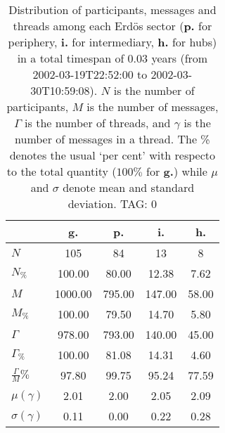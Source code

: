 \begin{table}[h!]
\begin{center}
\begin{tabular}{| l | c | c | c | c |}\hline
 & g. & p. & i. & h. \\\hline
$N$ & 105  & 84  & 13  & 8 \\\hline
$N_{\%}$ & 100.00  & 80.00  & 12.38  & 7.62 \\\hline
$M$ & 1000.00  & 795.00  & 147.00  & 58.00 \\\hline
$M_{\%}$ & 100.00  & 79.50  & 14.70  & 5.80 \\\hline
$\Gamma$ & 978.00  & 793.00  & 140.00  & 45.00 \\\hline
$\Gamma_{\%}$ & 100.00  & 81.08  & 14.31  & 4.60 \\\hline
$\frac{\Gamma}{M}\%$ & 97.80  & 99.75  & 95.24  & 77.59 \\\hline
$\mu(\gamma)$ & 2.01  & 2.00  & 2.05  & 2.09 \\\hline
$\sigma(\gamma)$ & 0.11  & 0.00  & 0.22  & 0.28 \\\hline
\end{tabular}
\caption{Distribution of participants, messages and threads among each Erd\"os sector ({\bf p.} for periphery, {\bf i.} for intermediary, 
    {\bf h.} for hubs) in a total timespan of 0.03 years (from 2002-03-19T22:52:00 to 2002-03-30T10:59:08). $N$ is the number of participants, $M$ is the number of messages, $\Gamma$ is the number of threads, and $\gamma$ is the number of messages in a thread.
    The \% denotes the usual `per cent' with respecto to the total quantity ($100\%$ for {\bf g.})
    while $\mu$ and $\sigma$ denote mean and standard deviation. TAG: 0}
\end{center}
\end{table}